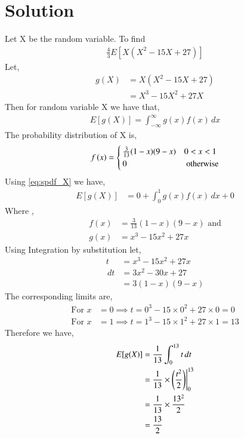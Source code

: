 \documentclass[journal,12pt,twocolumn]{IEEEtran}
\begin{document}
\section{Solution}
Let X be the random variable. To find 
\begin{align}
    \frac{4}{3} E[X(X^2 -15X + 27)]
\end{align}
Let,
\begin{align}
    g(X) &= X(X^2 -15X + 27)  \\
         &= X^3 -15X^2 + 27X
\end{align}
Then for random variable X we have that,
\begin{align}
    E[g(X)] = \int_{-\infty}^{\infty} g(x)f(x) \,dx
\end{align}
The probability distribution of X is,
\begin{align}
\label{eq:spdf_X}
f\left(x\right) = 
\begin{cases}
\frac{3}{13}(1-x)(9-x) & 0 < x < 1
\\
0 & \text{ otherwise}
\end{cases}
\end{align}
Using \ref{eq:spdf_X} we have,
\begin{align}
    E[g(X)] &= 0 +\int_{0}^{1} g(x)f(x) \,dx + 0
\end{align}
Where ,
\begin{align}
    f(x ) &= \frac{3}{13}(1-x)(9-x) \text{ and}  \\
    g(x) &= x^3 -15x^2 + 27x
\end{align}
Using Integration by substitution let,
\begin{align*}
    t &= x^3 - 15x^2 + 27x \\
    \,dt &= 3x^2 - 30x + 27 \\
         &= 3(1-x)(9-x)
\end{align*}
The corresponding limits are,
\begin{align}
    \text{For } x &=0  \implies t = 0^3 -15\times 0^2 + 27 \times 0 = 0 \\
        \text{For } x &=1  \implies t = 1^3 -15\times 1^2 + 27 \times 1 = 13
\end{align}
Therefore we have,
\begin{align}
    E[g(X)] &= \frac{1}{13} \int_{0}^{13} t \,dt \\
    & = \frac{1}{13} \times \left(\frac{t^2}{2}\right)  \Biggr|_{0}^{13} \\
    &= \frac{1}{13} \times \frac{13^2}{2} \\
    & = \frac{13}{2} 
\end{align}
\end{document}
